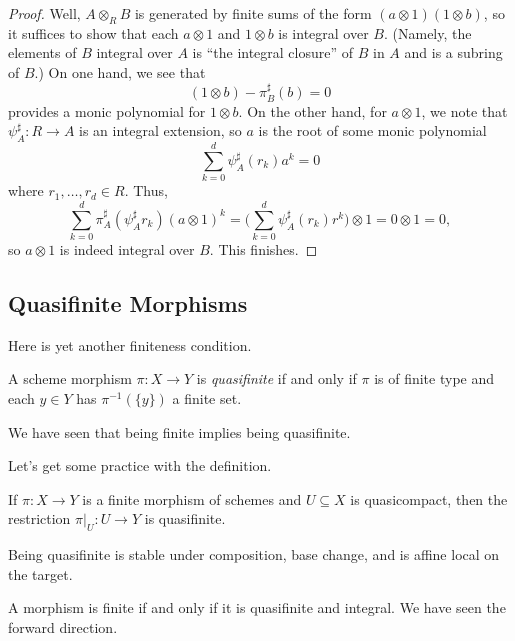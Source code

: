 \documentclass[../notes.tex]{subfiles}
\begin{document}
\begin{proof}
	Well, $A\otimes_RB$ is generated by finite sums of the form $(a\otimes 1)(1\otimes b)$, so it suffices to show that each $a\otimes 1$ and $1\otimes b$ is integral over $B$. (Namely, the elements of $B$ integral over $A$ is ``the integral closure'' of $B$ in $A$ and is a subring of $B$.) On one hand, we see that
	\[(1\otimes b)-\pi^\sharp_B(b)=0\]
	provides a monic polynomial for $1\otimes b$. On the other hand, for $a\otimes 1$, we note that $\psi^\sharp_A\colon R\to A$ is an integral extension, so $a$ is the root of some monic polynomial
	\[\sum_{k=0}^d\psi^\sharp_A(r_k)a^k=0\]
	where $r_1,\ldots,r_d\in R$. Thus,
	\[\sum_{k=0}^d\pi^\sharp_A(\psi^\sharp_Ar_k)(a\otimes1)^k=\Bigg(\sum_{k=0}^d\psi^\sharp_A(r_k)r^k\Bigg)\otimes1=0\otimes1=0,\]
	so $a\otimes1$ is indeed integral over $B$. This finishes.
\end{proof}

\subsection{Quasifinite Morphisms}
Here is yet another finiteness condition.
\begin{definition}[Quasifinite]
	A scheme morphism $\pi\colon X\to Y$ is \textit{quasifinite} if and only if $\pi$ is of finite type and each $y\in Y$ has $\pi^{-1}(\{y\})$ a finite set.
\end{definition}
\begin{remark}
	We have seen that being finite implies being quasifinite.
\end{remark}
Let's get some practice with the definition.
\begin{lemma}
	If $\pi\colon X\to Y$ is a finite morphism of schemes and $U\subseteq X$ is quasicompact, then the restriction $\pi|_U\colon U\to Y$ is quasifinite.
\end{lemma}
\begin{remark}
	Being quasifinite is stable under composition, base change, and is affine local on the target.
\end{remark}
\begin{remark}
	A morphism is finite if and only if it is quasifinite and integral. We have seen the forward direction.
\end{remark}
\end{document}
